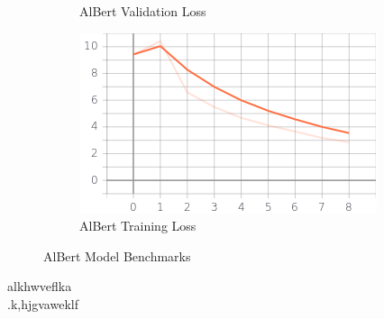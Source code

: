 \documentclass[a4paper,12pt]{report}
\begin{document}
\begin{figure}
\begin{subfigure}[b]{0.475\textwidth}
    		\caption{\small AlBert Validation Loss}
    		\label{albertValLoss}
    	\end{subfigure}
    	\hfill
    	\begin{subfigure}[b]{0.475\textwidth}
    		\centering
    		\includegraphics[width=\textwidth]{../images/Albert_Train_Loss.png}
    		\caption{\small AlBert Training Loss}
    		\label{albertTrainLoss}
    	\end{subfigure}
    	\caption{AlBert Model Benchmarks}
    	\label{albertBenchmarks}
    \end{figure}
alkhwveflka\\
.k,hjgvaweklf
\end{document}
